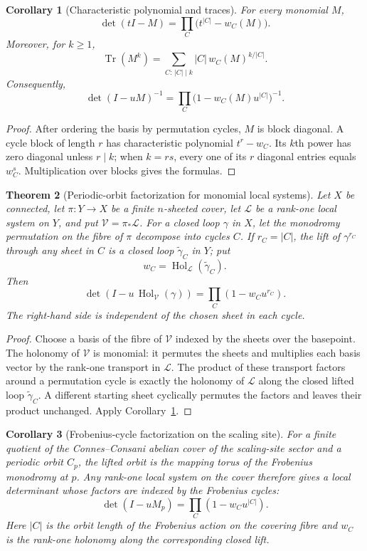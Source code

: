 \documentclass[11pt]{amsart}
\numberwithin{equation}{section}
\newtheorem{theorem}{Theorem}[section]
\newtheorem{corollary}[theorem]{Corollary}
\theoremstyle{definition}
\newcommand{\Tr}{\operatorname{Tr}}
\newcommand{\Hol}{\operatorname{Hol}}
\begin{document}
\begin{corollary}[Characteristic polynomial and traces]
\label{cor:weighted-cycle-characteristic}
For every monomial $M$,
\[
\boxed{
\det(tI-M)=\prod_C\bigl(t^{|C|}-w_C(M)\bigr).
}
\]
Moreover, for $k\ge1$,
\[
\boxed{
\Tr(M^k)=
\sum_{C:\,|C|\mid k}|C|\,w_C(M)^{k/|C|}.
}
\]
Consequently,
\[
\det(I-uM)^{-1}
=\prod_C\bigl(1-w_C(M)u^{|C|}\bigr)^{-1}.
\]
\end{corollary}

\begin{proof}
After ordering the basis by permutation cycles, $M$ is block diagonal.  A
cycle block of length $r$ has characteristic polynomial $t^r-w_C$.  Its
$k$th power has zero diagonal unless $r\mid k$; when $k=rs$, every one of
its $r$ diagonal entries equals $w_C^s$.  Multiplication over blocks gives
the formulas.
\end{proof}

\begin{theorem}[Periodic-orbit factorization for monomial local systems]
\label{thm:monomial-periodic-euler-factor}
Let $X$ be connected, let $\pi:Y\to X$ be a finite $n$-sheeted cover, let
$\mathcal L$ be a rank-one local system on $Y$, and put
$\mathcal V=\pi_*\mathcal L$.  For a closed loop $\gamma$ in $X$, let the
monodromy permutation on the fibre of $\pi$ decompose into cycles $C$.
If $r_C=|C|$, the lift of $\gamma^{r_C}$ through any sheet in $C$ is a
closed loop $\widetilde\gamma_C$ in $Y$; put
\[
w_C=\Hol_{\mathcal L}(\widetilde\gamma_C).
\]
Then
\[
\boxed{
\det(I-u\,\Hol_{\mathcal V}(\gamma))
=\prod_C(1-w_Cu^{r_C}).
}
\]
The right-hand side is independent of the chosen sheet in each cycle.
\end{theorem}

\begin{proof}
Choose a basis of the fibre of $\mathcal V$ indexed by the sheets over the
basepoint.  The holonomy of $\mathcal V$ is monomial: it permutes the sheets
and multiplies each basis vector by the rank-one transport in $\mathcal L$.
The product of these transport factors around a permutation cycle is
exactly the holonomy of $\mathcal L$ along the closed lifted loop
$\widetilde\gamma_C$.  A different starting sheet cyclically permutes the
factors and leaves their product unchanged.  Apply
Corollary~\ref{cor:weighted-cycle-characteristic}.
\end{proof}

\begin{corollary}[Frobenius-cycle factorization on the scaling site]
\label{cor:scaling-frobenius-cycle-factor}
For a finite quotient of the Connes--Consani abelian cover of the
scaling-site sector and a periodic orbit $C_p$, the lifted orbit is the
mapping torus of the Frobenius
monodromy at $p$.  Any rank-one local system on the cover therefore gives a
local determinant whose factors are indexed by the Frobenius cycles:
\[
\det(I-uM_p)=\prod_C(1-w_Cu^{|C|}).
\]
Here $|C|$ is the orbit length of the Frobenius action on the covering
fibre and $w_C$ is the rank-one holonomy along the corresponding closed
lift.
\end{corollary}
\end{document}
